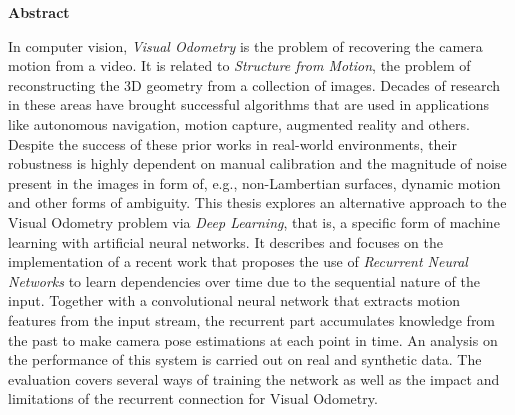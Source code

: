 \thispagestyle{empty}
\vspace{8cm}
\noindent
{\centerline {\bf \large Abstract}}
\vspace{1cm}

\noindent
In computer vision, \emph{Visual Odometry} is the problem of recovering the camera motion from a video.
It is related to \emph{Structure from Motion}, the problem of reconstructing the 3D geometry from a collection of images.
Decades of research in these areas have brought successful algorithms that are used in applications like autonomous navigation, motion capture, augmented reality and others.
Despite the success of these prior works in real-world environments, their robustness is highly dependent on manual calibration and the magnitude of noise present in the images in form of, e.g.\@, non-Lambertian surfaces, dynamic motion and other forms of ambiguity.
This thesis explores an alternative approach to the Visual Odometry problem via \emph{Deep Learning}, that is, a specific form of machine learning with artificial neural networks.
It describes and focuses on the implementation of a recent work that proposes the use of \emph{Recurrent Neural Networks} to learn dependencies over time due to the sequential nature of the input.
Together with a convolutional neural network that extracts motion features from the input stream, the recurrent part accumulates knowledge from the past to make camera pose estimations at each point in time.
An analysis on the performance of this system is carried out on real and synthetic data.
The evaluation covers several ways of training the network as well as the impact and limitations of the recurrent connection for Visual Odometry.
